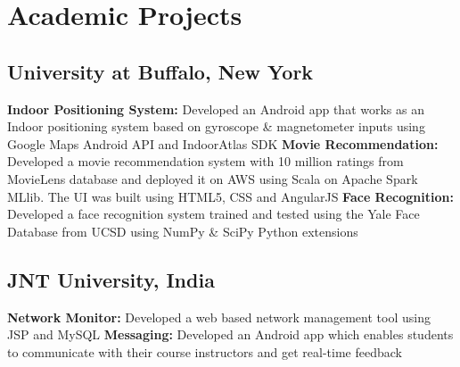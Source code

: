 \documentclass[11pt,a4paper,sans]{moderncv}
\begin{document}
\section{Academic Projects}
\subsection{University at Buffalo, New York}
{\textbf{Indoor Positioning System:} Developed an Android app that works as an Indoor positioning system based on gyroscope \& magnetometer inputs using Google Maps Android API and IndoorAtlas SDK}
{\textbf{Movie Recommendation:} Developed a movie recommendation system with 10 million ratings from MovieLens database and deployed it on AWS using Scala on Apache Spark MLlib. The UI was built using HTML5, CSS and AngularJS}
{\textbf{Face Recognition:} Developed a face recognition system trained and tested using the Yale Face Database from UCSD using NumPy \& SciPy Python extensions}{}
\vspace*{-1mm}
\subsection{JNT University, India}
{\textbf{Network Monitor:} Developed a web based network management tool using JSP and MySQL}
{\textbf{Messaging:} Developed an Android app which enables students to communicate with their course instructors and get real-time feedback }
\end{document}
